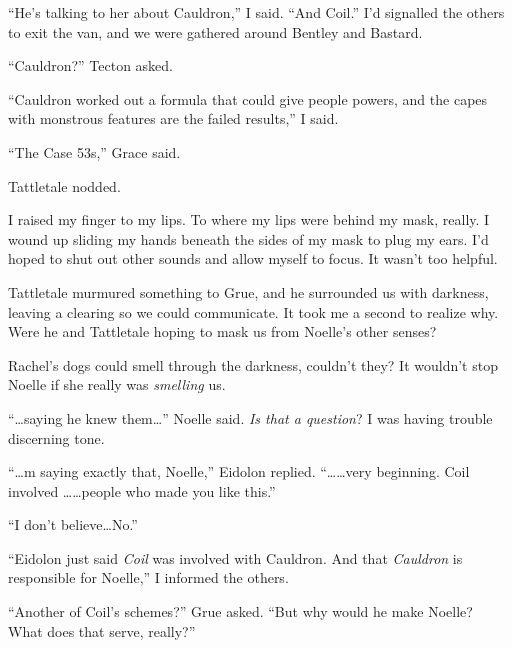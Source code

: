 





``He's talking to her about Cauldron,'' I said.  ``And Coil.''  I'd signalled the others to exit the van, and we were gathered around Bentley and Bastard.



``Cauldron?''  Tecton asked.



``Cauldron worked out a formula that could give people powers, and the capes with monstrous features are the failed results,'' I said.



``The Case 53s,'' Grace said.



Tattletale nodded.



I raised my finger to my lips.  To where my lips were behind my mask, really.  I wound up sliding my hands beneath the sides of my mask to plug my ears.  I'd hoped to shut out other sounds and allow myself to focus.  It wasn't too helpful.



Tattletale murmured something to Grue, and he surrounded us with darkness, leaving a clearing so we could communicate.  It took me a second to realize why.  Were he and Tattletale hoping to mask us from Noelle's other senses?



Rachel's dogs could smell through the darkness, couldn't they?  It wouldn't stop Noelle if she really was \emph{smelling} us.



``\ldots{}saying he knew them\ldots'' Noelle said.  \emph{Is that a question}?  I was having trouble discerning tone.



``\ldots{}m saying exactly that, Noelle,'' Eidolon replied.  ``\ldots \ldots very beginning.  Coil involved \ldots \ldots people who made you like this.''



``I don't believe\ldots No.''



``Eidolon just said \emph{Coil} was involved with Cauldron.  And that \emph{Cauldron} is responsible for Noelle,'' I informed the others.



``Another of Coil's schemes?'' Grue asked.  ``But why would he make Noelle?  What does that serve, really?''




